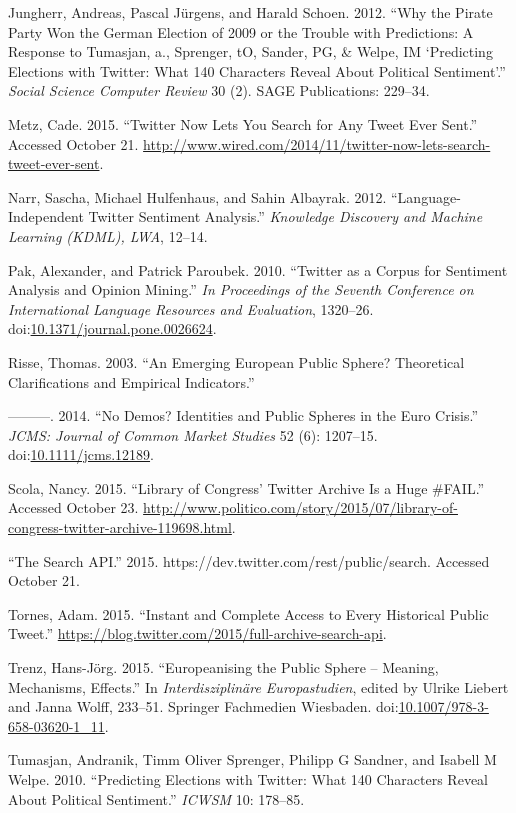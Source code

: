 \documentclass[]{article}
\begin{document}
Jungherr, Andreas, Pascal J{ü}rgens, and Harald Schoen. 2012. ``Why the
Pirate Party Won the German Election of 2009 or the Trouble with
Predictions: A Response to Tumasjan, a., Sprenger, tO, Sander, PG, \&
Welpe, IM `Predicting Elections with Twitter: What 140 Characters Reveal
About Political Sentiment'.'' \emph{Social Science Computer Review} 30
(2). SAGE Publications: 229--34.

Metz, Cade. 2015. ``Twitter Now Lets You Search for Any Tweet Ever
Sent.'' Accessed October 21.
\url{http://www.wired.com/2014/11/twitter-now-lets-search-tweet-ever-sent}.

Narr, Sascha, Michael Hulfenhaus, and Sahin Albayrak. 2012.
``Language-Independent Twitter Sentiment Analysis.'' \emph{Knowledge
Discovery and Machine Learning (KDML), LWA}, 12--14.

Pak, Alexander, and Patrick Paroubek. 2010. ``Twitter as a Corpus for
Sentiment Analysis and Opinion Mining.'' \emph{In Proceedings of the
Seventh Conference on International Language Resources and Evaluation},
1320--26.
doi:\href{http://dx.doi.org/10.1371/journal.pone.0026624}{10.1371/journal.pone.0026624}.

Risse, Thomas. 2003. ``An Emerging European Public Sphere? Theoretical
Clarifications and Empirical Indicators.''

---------. 2014. ``No Demos? Identities and Public Spheres in the Euro
Crisis.'' \emph{JCMS: Journal of Common Market Studies} 52 (6):
1207--15.
doi:\href{http://dx.doi.org/10.1111/jcms.12189}{10.1111/jcms.12189}.

Scola, Nancy. 2015. ``Library of Congress' Twitter Archive Is a Huge
\#FAIL.'' Accessed October 23.
\url{http://www.politico.com/story/2015/07/library-of-congress-twitter-archive-119698.html}.

``The Search API.'' 2015. https://dev.twitter.com/rest/public/search.
Accessed October 21.

Tornes, Adam. 2015. ``Instant and Complete Access to Every Historical
Public Tweet.''
\url{https://blog.twitter.com/2015/full-archive-search-api}.

Trenz, Hans-Jörg. 2015. ``Europeanising the Public Sphere -- Meaning,
Mechanisms, Effects.'' In \emph{Interdisziplinäre Europastudien}, edited
by Ulrike Liebert and Janna Wolff, 233--51. Springer Fachmedien
Wiesbaden.
doi:\href{http://dx.doi.org/10.1007/978-3-658-03620-1_11}{10.1007/978-3-658-03620-1\_11}.

Tumasjan, Andranik, Timm Oliver Sprenger, Philipp G Sandner, and Isabell
M Welpe. 2010. ``Predicting Elections with Twitter: What 140 Characters
Reveal About Political Sentiment.'' \emph{ICWSM} 10: 178--85.
\end{document}
